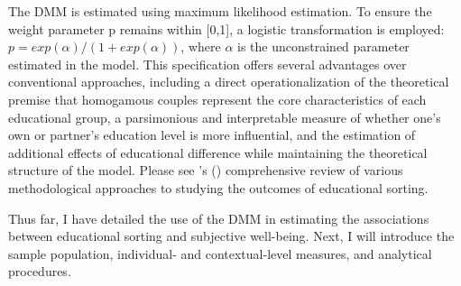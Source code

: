 The DMM is estimated using maximum likelihood estimation. To ensure the weight parameter p remains within [0,1], a logistic transformation is employed: $p = exp(\alpha)/(1+exp(\alpha))$, where $\alpha$ is the unconstrained parameter estimated in the model. This specification offers several advantages over conventional approaches, including a direct operationalization of the theoretical premise that homogamous couples represent the core characteristics of each educational group, a parsimonious and interpretable measure of whether one's own or partner's education level is more influential, and the estimation of additional effects of educational difference while maintaining the theoretical structure of the model. Please see \citeauthor{eeckhautAnalysingEffectEducational2013}'s (\citeyear{eeckhautAnalysingEffectEducational2013}) comprehensive review of various methodological approaches to studying the outcomes of educational sorting.

Thus far, I have detailed the use of the DMM in estimating the associations between educational sorting and subjective well-being. Next, I will introduce the sample population, individual- and contextual-level measures, and analytical procedures.
